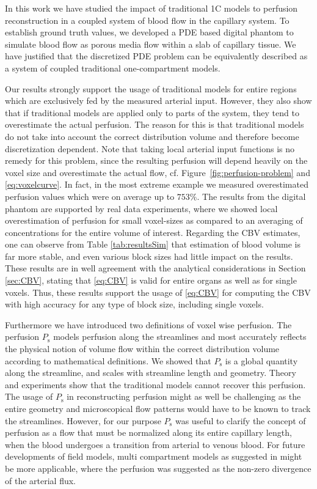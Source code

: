 \documentclass[journal,twocolumn]{IEEEtran}
\newcommand{\Perfs}{P_{\mathrm{s}}}
\begin{document}
	In this work we have studied the impact of traditional 1C models to perfusion reconstruction in a coupled system of blood flow in the capillary system.
	To establish ground truth values, we developed a PDE based digital phantom to simulate blood flow as porous media flow within a slab of capillary tissue.
	We have justified that the discretized PDE problem can be equivalently described as a system of coupled traditional one-compartment models.	
	
	Our results strongly support the usage of traditional models for entire regions which are exclusively fed by the measured arterial input.
	However, they also show that if traditional models are applied only to parts of the system, they tend to overestimate the actual perfusion. The reason for this is that traditional models do not take into account the correct distribution volume and therefore become discretization dependent.
	Note that taking local arterial input functions is no remedy for this problem, since the resulting perfusion will depend heavily on the voxel size and overestimate the actual flow, cf. Figure~\ref{fig:perfusion-problem} and \eqref{eq:voxelcurve}.
	In fact, in the most extreme example we measured overestimated perfusion values which were on average up to $753\%$.
	The results from the digital phantom are supported by real data experiments, where we showed local overestimation of perfusion for small voxel-sizes as compared to an averaging of concentrations for the entire volume of interest.
	Regarding the CBV estimates, one can observe from Table \ref{tab:resultsSim} that estimation of blood volume is far more stable, and  even various block sizes had little impact on the results. 
	These results are in well agreement with the analytical considerations in Section \ref{sec:CBV}, stating that \eqref{eq:CBV} is valid for entire organs as well as for single voxels. 
	Thus, these results support the usage of \eqref{eq:CBV} for computing the CBV with high accuracy for any type of block size, including single voxels.
	
	Furthermore we have introduced two definitions of voxel wise perfusion.
	The perfusion $\Perfs$ models perfusion along the streamlines and most accurately reflects the physical notion of volume flow within the correct distribution volume according to mathematical definitions. We showed that $\Perfs$ is a global quantity along the streamline, and scales with streamline length and geometry.
	Theory and experiments show that the traditional models cannot recover this perfusion. The usage of $\Perfs$ in reconstructing perfusion might as well be challenging as the entire geometry and microscopical flow patterns would have to be known to track the streamlines. However, for our purpose $\Perfs$ was useful to clarify the concept of perfusion as a flow that must be normalized along its entire capillary length, when the blood undergoes a transition from arterial to venous blood. 
	For future developments of field models, multi compartment models as suggested in \cite{sourbron14} might be more applicable, where the perfusion was suggested as the non-zero divergence of the arterial flux.
	
\end{document}
